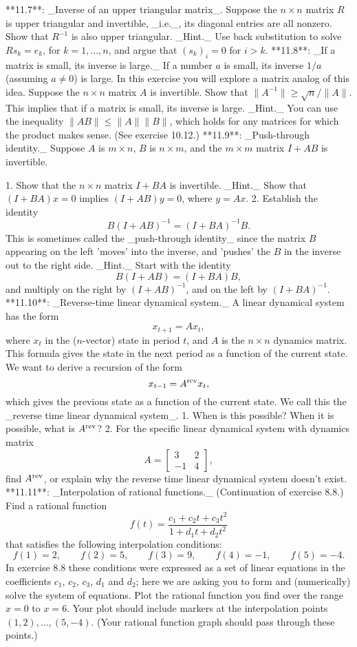 

**11.7**: _Inverse of an upper triangular matrix_. Suppose the \(n\times n\) matrix \(R\) is upper triangular and invertible, _i.e._, its diagonal entries are all nonzero. Show that \(R^{-1}\) is also upper triangular. _Hint._ Use back substitution to solve \(Rs_{k}=e_{k}\), for \(k=1,\ldots,n\), and argue that \((s_{k})_{i}=0\) for \(i>k\).
**11.8**: _If a matrix is small, its inverse is large._ If a number \(a\) is small, its inverse \(1/a\) (assuming \(a\neq 0\)) is large. In this exercise you will explore a matrix analog of this idea. Suppose the \(n\times n\) matrix \(A\) is invertible. Show that \(\|A^{-1}\|\geq\sqrt{n}/\|A\|\). This implies that if a matrix is small, its inverse is large. _Hint._ You can use the inequality \(\|AB\|\leq\|A\|\|B\|\), which holds for any matrices for which the product makes sense. (See exercise 10.12.)
**11.9**: _Push-through identity._ Suppose \(A\) is \(m\times n\), \(B\) is \(n\times m\), and the \(m\times m\) matrix \(I+AB\) is invertible.

1. Show that the \(n\times n\) matrix \(I+BA\) is invertible. _Hint._ Show that \((I+BA)x=0\) implies \((I+AB)y=0\), where \(y=Ax\).
2. Establish the identity \[B(I+AB)^{-1}=(I+BA)^{-1}B.\] This is sometimes called the _push-through identity_ since the matrix \(B\) appearing on the left 'moves' into the inverse, and 'pushes' the \(B\) in the inverse out to the right side. _Hint._ Start with the identity \[B(I+AB)=(I+BA)B,\] and multiply on the right by \((I+AB)^{-1}\), and on the left by \((I+BA)^{-1}\).
**11.10**: _Reverse-time linear dynamical system._ A linear dynamical system has the form \[x_{t+1}=Ax_{t},\] where \(x_{t}\) in the (\(n\)-vector) state in period \(t\), and \(A\) is the \(n\times n\) dynamics matrix. This formula gives the state in the next period as a function of the current state. We want to derive a recursion of the form \[x_{t-1}=A^{\rm rev}x_{t},\] which gives the previous state as a function of the current state. We call this the _reverse time linear dynamical system_. 1. When is this possible? When it is possible, what is \(A^{\rm rev}\)? 2. For the specific linear dynamical system with dynamics matrix \[A=\left[\begin{array}{cc}3&2\\ -1&4\end{array}\right],\] find \(A^{\rm rev}\), or explain why the reverse time linear dynamical system doesn't exist.
**11.11**: _Interpolation of rational functions._ (Continuation of exercise 8.8.) Find a rational function \[f(t)=\frac{c_{1}+c_{2}t+c_{3}t^{2}}{1+d_{1}t+d_{2}t^{2}}\] that satisfies the following interpolation conditions: \[f(1)=2,\qquad f(2)=5,\qquad f(3)=9,\qquad f(4)=-1,\qquad f(5)=-4.\] In exercise 8.8 these conditions were expressed as a set of linear equations in the coefficients \(c_{1}\), \(c_{2}\), \(c_{3}\), \(d_{1}\) and \(d_{2}\); here we are asking you to form and (numerically) solve the system of equations. Plot the rational function you find over the range \(x=0\) to \(x=6\). Your plot should include markers at the interpolation points \((1,2),\ldots,(5,-4)\). (Your rational function graph should pass through these points.)